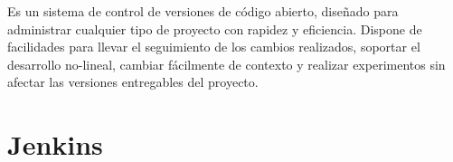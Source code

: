 Es un sistema de control de versiones de código abierto, diseñado para administrar cualquier tipo de proyecto con rapidez y eficiencia. Dispone de facilidades para llevar el seguimiento de los cambios realizados, soportar el desarrollo no-lineal, cambiar fácilmente de contexto y realizar experimentos sin afectar las versiones entregables del proyecto. 
\cite{Git}

\section{Jenkins}




